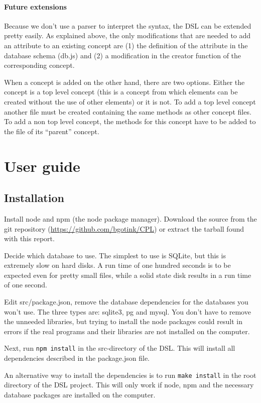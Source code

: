 \documentclass[a4paper,11pt]{article}
\newcommand{\npar}{\par \vspace{2.3ex plus 0.3ex minus 0.3ex} \noindent}
\begin{document}
\paragraph*{Future extensions} Because we don't use a parser to interpret the syntax, the DSL can be extended pretty easily. As explained above, the only modifications that are needed to add an attribute to an existing concept are (1) the definition of the attribute in the database schema (db.js) and (2) a modification in the creator function of the corresponding concept. 
\par When a concept is added on the other hand, there are two options. Either the concept is a top level concept (this is a concept from which elements can be created without the use of other elements) or it is not. To add a top level concept another file must be created containing the same methods as other concept files. To add a non top level concept, the methods for this concept have to be added to the file of its ``parent'' concept.
\clearpage
\section{User guide}

\subsection{Installation}
Install node and npm (the node package manager). Download the source from the git repository (\url{https://github.com/bgotink/CPL}) or extract the tarball found with this report.
\npar Decide which database to use. The simplest to use is SQLite, but this is extremely slow on hard disks. A run time of one hundred seconds is to be expected even for pretty small files, while a solid state disk results in a run time of one second.
\par Edit src/package.json, remove the database dependencies for the databases you won't use. The three types are: sqlite3, pg and mysql. You don't have to remove the unneeded libraries, but trying to install the node packages could result in errors if the real programs and their libraries are not installed on the computer.
\npar Next, run \texttt{npm install} in the src-directory of the DSL. This will install all dependencies described in the package.json file.

\npar An alternative way to install the dependencies is to run \texttt{make install} in the root directory of the DSL project. This will only work if node, npm and the necessary database packages are installed on the computer.
\end{document}
